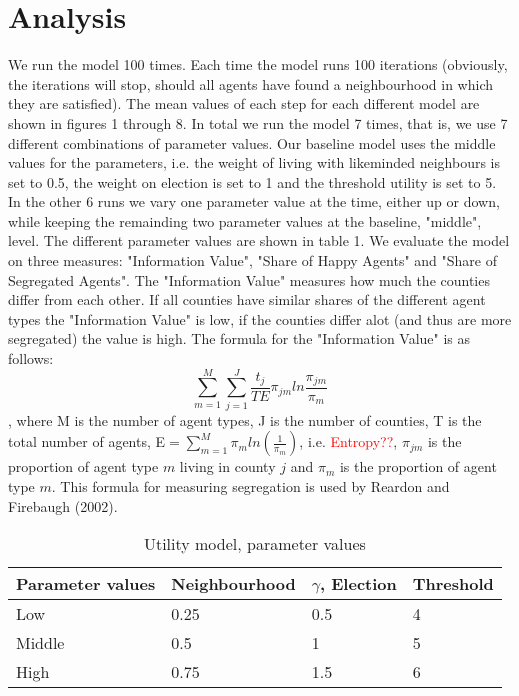 \documentclass[12pt, a4paper]{article}
\begin{document}
\section{\label{sec_res}Analysis}
We run the model 100 times. Each time the model runs 100 iterations (obviously, the iterations will stop, should all agents have found a neighbourhood in which they are satisfied). The mean values of each step for each different model are shown in figures 1 through 8. In total we run the model 7 times, that is, we use 7 different combinations of parameter values. Our baseline model uses the middle values for the parameters, i.e. the weight of living with likeminded neighbours is set to 0.5, the weight on election is set to 1 and the threshold utility is set to 5. In the other 6 runs we vary one parameter value at the time, either up or down, while keeping the remainding two parameter values at the baseline, "middle", level. The different parameter values are shown in table 1. We evaluate the model on three measures: "Information Value", "Share of Happy Agents" and "Share of Segregated Agents". The "Information Value" measures how much the counties differ from each other. If all counties have similar shares of the different agent types the "Information Value" is low, if the counties differ alot (and thus are more segregated) the value is high. The formula for the "Information Value" is as follows: \newline \newline
$$\sum_{m=1}^{M}\sum_{j=1}^{J}\frac{t_j}{TE}\pi_{jm}ln\frac{\pi_{jm}}{\pi_m}$$, where M is the number of agent types, J is the number of counties, T is the total number of agents, E$=\sum_{m=1}^{M}\pi_m ln(\frac{1}{\pi_m})$, i.e. \textcolor{red}{Entropy??}, $\pi_{jm}$ is the proportion of agent type $m$ living in county $j$ and $\pi_m$ is the proportion of agent type $m$. This formula for measuring segregation is used by Reardon and Firebaugh (2002). 

\begin{table}[ht]
\centering
\caption{Utility model, parameter values}
\begin{tabular}{llll}
  \hline
Parameter values & Neighbourhood & $\gamma$, Election & Threshold \\ 
  \hline \hline
Low & 0.25 & 0.5 & 4 \\ 
  Middle & 0.5 & 1 & 5 \\ 
  High & 0.75 & 1.5 & 6 \\ \hline
   \hline
\end{tabular}
\end{table}
\end{document}
